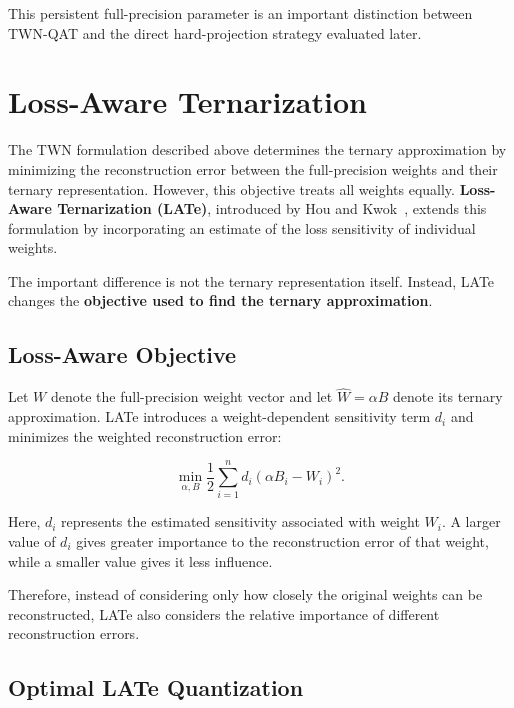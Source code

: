 \documentclass[conference]{IEEEtran}
\begin{document}
This persistent full-precision parameter is an important distinction
between TWN-QAT and the direct hard-projection strategy evaluated later.


\section{Loss-Aware Ternarization}

The TWN formulation described above determines the ternary
approximation by minimizing the reconstruction error between the
full-precision weights and their ternary representation. However, this
objective treats all weights equally. \textbf{Loss-Aware Ternarization
(LATe)}, introduced by Hou and Kwok~\cite{hou2018lossaware}, extends
this formulation by incorporating an estimate of the loss sensitivity
of individual weights.

The important difference is not the ternary representation itself.
Instead, LATe changes the \textbf{objective used to find the ternary
approximation}.

\subsection{Loss-Aware Objective}

Let $W$ denote the full-precision weight vector and let
$\hat{W}=\alpha B$ denote its ternary approximation. LATe introduces a
weight-dependent sensitivity term $d_i$ and minimizes the weighted
reconstruction error:

\begin{equation}
\min_{\alpha,B}
\frac{1}{2}
\sum_{i=1}^{n}
d_i
\left(\alpha B_i-W_i\right)^2.
\end{equation}

Here, $d_i$ represents the estimated sensitivity associated with
weight $W_i$. A larger value of $d_i$ gives greater importance to the
reconstruction error of that weight, while a smaller value gives it
less influence.

Therefore, instead of considering only how closely the original
weights can be reconstructed, LATe also considers the relative
importance of different reconstruction errors.

\subsection{Optimal LATe Quantization}
\end{document}
